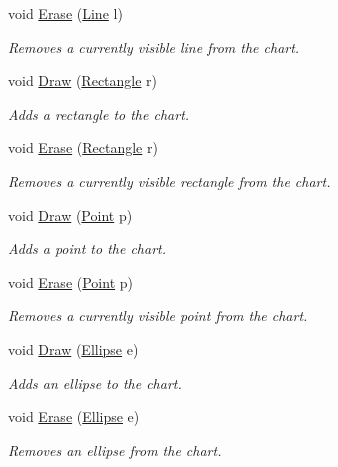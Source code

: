 \begin{DoxyCompactItemize}
void \mbox{\hyperlink{class_s_g_l_1_1_graph_ae091fb4ee52a500a4c6d186bc4b5d27f}{Erase}} (\mbox{\hyperlink{class_s_g_l_1_1_line}{Line}} l)
\begin{DoxyCompactList}\small\item\em Removes a currently visible line from the chart. \end{DoxyCompactList}\item 
void \mbox{\hyperlink{class_s_g_l_1_1_graph_ab9f18f59b4f05c9a3dcb2277634532d5}{Draw}} (\mbox{\hyperlink{class_s_g_l_1_1_rectangle}{Rectangle}} r)
\begin{DoxyCompactList}\small\item\em Adds a rectangle to the chart. \end{DoxyCompactList}\item 
void \mbox{\hyperlink{class_s_g_l_1_1_graph_ae0b009d2b01edfb52598f28fc89728da}{Erase}} (\mbox{\hyperlink{class_s_g_l_1_1_rectangle}{Rectangle}} r)
\begin{DoxyCompactList}\small\item\em Removes a currently visible rectangle from the chart. \end{DoxyCompactList}\item 
void \mbox{\hyperlink{class_s_g_l_1_1_graph_a2ef792871c730c14e38d7b33e97b7540}{Draw}} (\mbox{\hyperlink{struct_s_g_l_1_1_point}{Point}} p)
\begin{DoxyCompactList}\small\item\em Adds a point to the chart. \end{DoxyCompactList}\item 
void \mbox{\hyperlink{class_s_g_l_1_1_graph_a10cb5c6b153d39591b85cdf636269976}{Erase}} (\mbox{\hyperlink{struct_s_g_l_1_1_point}{Point}} p)
\begin{DoxyCompactList}\small\item\em Removes a currently visible point from the chart. \end{DoxyCompactList}\item 
void \mbox{\hyperlink{class_s_g_l_1_1_graph_ac0c3219e1779f5c5c6a0041177512198}{Draw}} (\mbox{\hyperlink{class_s_g_l_1_1_ellipse}{Ellipse}} e)
\begin{DoxyCompactList}\small\item\em Adds an ellipse to the chart. \end{DoxyCompactList}\item 
void \mbox{\hyperlink{class_s_g_l_1_1_graph_a8fb1d75464ea237e1424b99b0a0806f7}{Erase}} (\mbox{\hyperlink{class_s_g_l_1_1_ellipse}{Ellipse}} e)
\begin{DoxyCompactList}\small\item\em Removes an ellipse from the chart. \end{DoxyCompactList}\item 

\end{DoxyCompactItemize}

